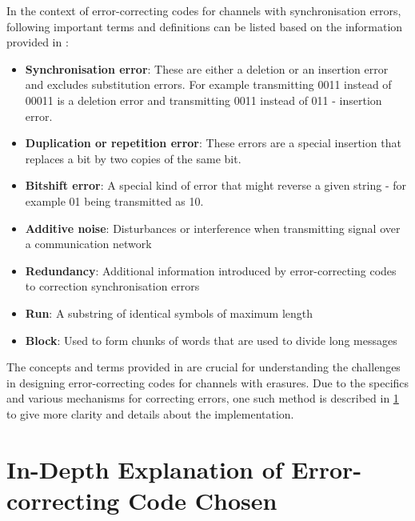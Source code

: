 \documentclass[12pt]%
{article}
\begin{document}
In the context of error-correcting codes for channels with synchronisation errors, following important terms and definitions can be listed based on the information provided in \cite{mercier2010survey}:
\begin{itemize}
\item \textbf{Synchronisation error}: These are either a deletion or an insertion error and excludes substitution errors. For example transmitting 0011 instead of 00011 is a deletion error and transmitting 0011 instead of 011 - insertion error.
\item \textbf{Duplication or repetition error}: These errors are a special insertion that replaces a bit by two copies of the same bit.
\item \textbf{Bitshift error}: A special kind of error that might reverse a given string - for example 01 being transmitted as 10.
\item \textbf{Additive noise}: Disturbances or interference when transmitting signal over a communication network
\item \textbf{Redundancy}: Additional information introduced by error-correcting codes to correction synchronisation errors 
\item \textbf{Run}: A substring of identical symbols of maximum length
\item \textbf{Block}: Used to form chunks of words that are used to divide long messages
\end{itemize}

The concepts and terms provided in \cite{mercier2010survey} are crucial for understanding the challenges in designing error-correcting codes for channels with erasures. Due to the specifics and various mechanisms for correcting errors, one such method is described in  \ref{sec:in_depth} to give more clarity and details about the implementation.

\newpage

\section{In-Depth Explanation of Error-correcting Code Chosen}\label{sec:in_depth}
\end{document}
